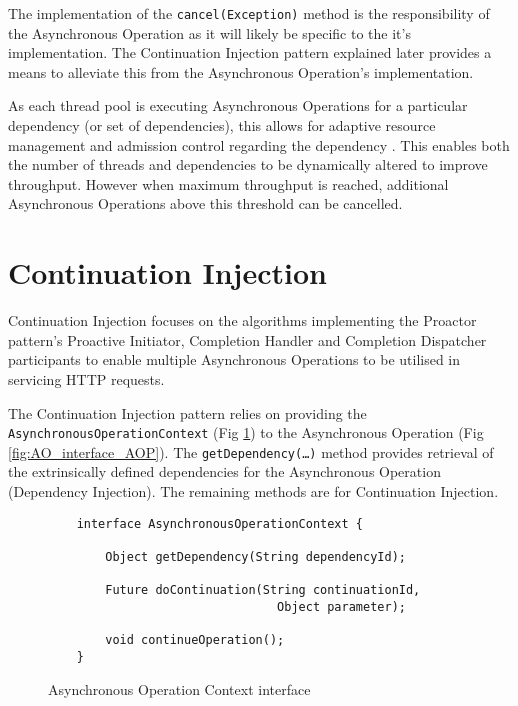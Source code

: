 \documentclass[prodmode]{style/acmlarge}
\begin{document}
The implementation of the \texttt{cancel(Exception)} method is the responsibility
of the Asynchronous Operation as it will likely be specific to the it's
implementation.  The Continuation Injection pattern explained later provides a
means to alleviate this from the Asynchronous Operation's implementation.

As each thread pool is executing Asynchronous Operations for a particular
dependency (or set of dependencies), this allows for adaptive resource management
and admission control regarding the dependency \cite{seda}.  This enables both
the number of threads and dependencies to be dynamically altered to improve
throughput.  However when maximum throughput is reached, additional Asynchronous
Operations above this threshold can be cancelled.


\section{Continuation Injection}

Continuation Injection focuses on the algorithms implementing the Proactor pattern's
Proactive Initiator, Completion Handler and Completion Dispatcher participants
to enable multiple Asynchronous Operations to be utilised in servicing HTTP
requests.

The Continuation Injection pattern relies on providing the
\texttt{AsynchronousOperationContext} (Fig \ref{fig:AOC_interface}) to the
Asynchronous Operation (Fig \ref{fig:AO_interface_AOP}).  The
\texttt{getDependency(\ldots)} method provides retrieval of the extrinsically
defined dependencies for the Asynchronous Operation (Dependency Injection).  The
remaining methods are for Continuation Injection.

\begin{figure}[tp]
\centering
\begin{verbatim}
    interface AsynchronousOperationContext {
    
        Object getDependency(String dependencyId);
        
        Future doContinuation(String continuationId, 
                                Object parameter);
        
        void continueOperation();
    }
\end{verbatim}
\caption{Asynchronous Operation Context interface\footnotemark}
\label{fig:AOC_interface}
\end{figure}
\end{document}
